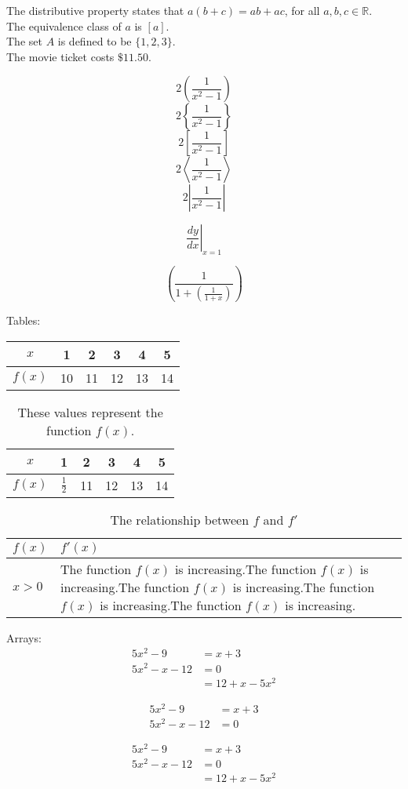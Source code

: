 \documentclass[11pt]{article}
\begin{document}
The distributive property states that $a(b+c)=ab+ac$, for all $a,b,c \in \mathbb{R}$. \\[6pt]
The equivalence class of $a$ is $[a]$. \\[6PT]
The set $A$ is defined to be $\{1,2,3\}$. \\[6pt]
The movie ticket costs $\$11.50$.

$$2\left(\frac{1}{x^2-1}\right)$$
$$2\left\{\frac{1}{x^2-1}\right\}$$
$$2\left[\frac{1}{x^2-1}\right]$$
$$2\left\langle\frac{1}{x^2-1}\right\rangle$$
$$2\left|\frac{1}{x^2-1}\right|$$

$$\left.\frac{dy}{dx}\right|_{x=1}$$

$$\left(\frac{1}{1+\left(\frac{1}{1+x}\right)}\right)$$


Tables:\\

\begin{tabular}{|c||c|c|c|c|c|}
\hline
$x$&1&2&3&4&5\\ \hline
$f(x)$&10&11&12&13&14\\ \hline
\end{tabular}

\vspace{1cm}

\begin{table}[H]
\centering
\def\arraystretch{1.5}
\begin{tabular}{|c||c|c|c|c|c|}
\hline
$x$&1&2&3&4&5\\ \hline
$f(x)$&$\frac{1}{2}$&11&12&13&14\\ \hline
\end{tabular}
\caption{These values represent the function $f(x).$}
\end{table}

\begin{table}[H]
\centering
\caption{The relationship between $f$ and $f'$}
\def\arraystretch{1.5}
\begin{tabular}{|l||p{3in}|}
\hline
$f(x)$&$f'(x)$\\ \hline
$x>0$&The function $f(x)$ is increasing.The function $f(x)$ is increasing.The function $f(x)$ is increasing.The function $f(x)$ is increasing.The function $f(x)$ is increasing.\\ \hline
\end{tabular}
\end{table}


Arrays:
\begin{align}
5x^2-9&=x+3\\
5x^2-x-12&= 0\\
&=12+x-5x^2
\end{align}

\begin{align*}
5x^2-9&= x+3\\
5x^2-x-12&= 0
\end{align*}

\begin{align}
5x^2-9&=x+3\\
5x^2-x-12&= 0\\
&=12+x-5x^2
\end{align}
\end{document}
